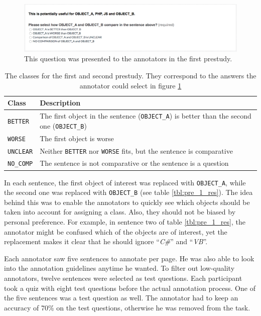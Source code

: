 \begin{figure}[h]
\centering
\caption{This question was presented to the annotators in the first prestudy.}
\label{img:1_question}
\includegraphics[width=1\linewidth]{images/prestudy/1_question}

\end{figure}

\begin{table}[h]
\centering
\caption{The classes for the first and second prestudy. They correspond to the answers the annotator could select in figure \ref{img:1_question}}
\label{tbl:prestudyclasses-a}
\begin{tabularx}{\linewidth}{lX}

\toprule
Class & Description \\ \midrule
\texttt{BETTER} & The first object in the sentence (\texttt{OBJECT\_A}) is better than the second one (\texttt{OBJECT\_B})\\
\texttt{WORSE} & The first object is worse \\
\texttt{UNCLEAR} & Neither \texttt{BETTER} nor \texttt{WORSE} fits, but the sentence is comparative\\
\texttt{NO\_COMP} & The sentence is not comparative or the sentence is a question\\
\bottomrule
\end{tabularx}
\end{table}

In each sentence, the first object of interest was replaced with \texttt{OBJECT\_A}, while the second one was replaced with \texttt{OBJECT\_B} (see table \ref{tbl:pre_1_res}). The idea behind this was to enable the annotators to quickly see which objects should be taken into account for assigning a class. Also, they should not be biased by personal preference. For example, in sentence two of table \ref{tbl:pre_1_res}, the annotator might be confused which of the objects are of interest, yet the replacement makes it clear that he should ignore \enquote{\emph{C\#}} and \enquote{\emph{VB}}. 

Each annotator saw five sentences to annotate per page. He was also able to look into the annotation guidelines anytime he wanted. To filter out low-quality annotators, twelve sentences were selected as test questions. Each participant took a quiz with eight test questions before the actual annotation process. One of the five sentences was a test question as well. The annotator had to keep an accuracy of 70\% on the test questions, otherwise he was removed from the task.

